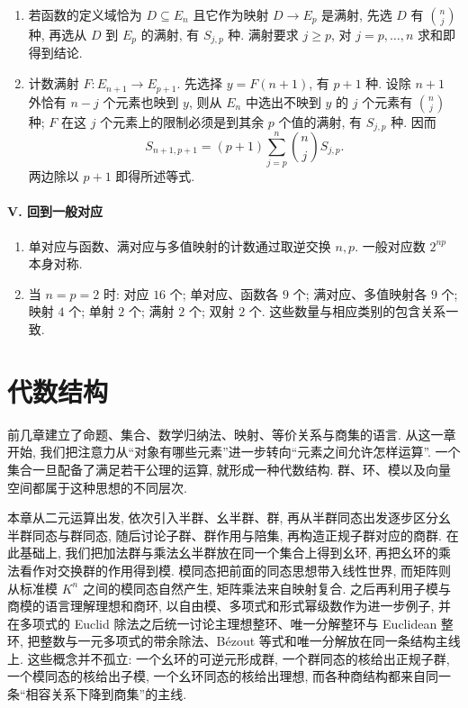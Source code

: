 \documentclass[usesamecnt, thmcnt=section, lang=cn, newtx, 10pt, scheme=chinese]{elegantbook}
\begin{document}
\begin{enumerate}[label=\textbf{\arabic*.}, start=17]
  \[
   S_{p+1,p}=\binom{p+1}{2}\,p\,(p-1)!
   =\binom{p+1}{2}p!.
  \]
  \item 若函数的定义域恰为 $D\subseteq E_n$ 且它作为映射 $D\to E_p$ 是满射, 先选 $D$ 有 $\binom nj$ 种, 再选从 $D$ 到 $E_p$ 的满射, 有 $S_{j,p}$ 种. 满射要求 $j\geq p$, 对 $j=p,\ldots,n$ 求和即得到结论.
  \item 计数满射 $F:E_{n+1}\to E_{p+1}$. 先选择 $y=F(n+1)$, 有 $p+1$ 种. 设除 $n+1$ 外恰有 $n-j$ 个元素也映到 $y$, 则从 $E_n$ 中选出不映到 $y$ 的 $j$ 个元素有 $\binom nj$ 种; $F$ 在这 $j$ 个元素上的限制必须是到其余 $p$ 个值的满射, 有 $S_{j,p}$ 种. 因而
  \[
   S_{n+1,p+1}
   =(p+1)\sum_{j=p}^{n}\binom njS_{j,p}.
  \]
  两边除以 $p+1$ 即得所述等式.
\end{enumerate}

\subsubsection*{V. 回到一般对应}
\begin{enumerate}[label=\textbf{\arabic*.}, start=29]
  \item 单对应与函数、满对应与多值映射的计数通过取逆交换 $n,p$. 一般对应数 $2^{np}$ 本身对称.
  \item 当 $n=p=2$ 时: 对应 $16$ 个; 单对应、函数各 $9$ 个; 满对应、多值映射各 $9$ 个; 映射 $4$ 个; 单射 $2$ 个; 满射 $2$ 个; 双射 $2$ 个. 这些数量与相应类别的包含关系一致.
\end{enumerate}

\chapter{代数结构}

前几章建立了命题、集合、数学归纳法、映射、等价关系与商集的语言. 从这一章开始, 我们把注意力从``对象有哪些元素''进一步转向``元素之间允许怎样运算''. 一个集合一旦配备了满足若干公理的运算, 就形成一种代数结构. 群、环、模以及向量空间都属于这种思想的不同层次.

本章从二元运算出发, 依次引入半群、幺半群、群, 再从半群同态出发逐步区分幺半群同态与群同态, 随后讨论子群、群作用与陪集, 再构造正规子群对应的商群. 在此基础上, 我们把加法群与乘法幺半群放在同一个集合上得到幺环, 再把幺环的乘法看作对交换群的作用得到模. 模同态把前面的同态思想带入线性世界, 而矩阵则从标准模 $K^n$ 之间的模同态自然产生, 矩阵乘法来自映射复合. 之后再利用子模与商模的语言理解理想和商环, 以自由模、多项式和形式幂级数作为进一步例子, 并在多项式的 Euclid 除法之后统一讨论主理想整环、唯一分解整环与 Euclidean 整环, 把整数与一元多项式的带余除法、Bézout 等式和唯一分解放在同一条结构主线上. 这些概念并不孤立: 一个幺环的可逆元形成群, 一个群同态的核给出正规子群, 一个模同态的核给出子模, 一个幺环同态的核给出理想, 而各种商结构都来自同一条``相容关系下降到商集''的主线.
\end{document}
